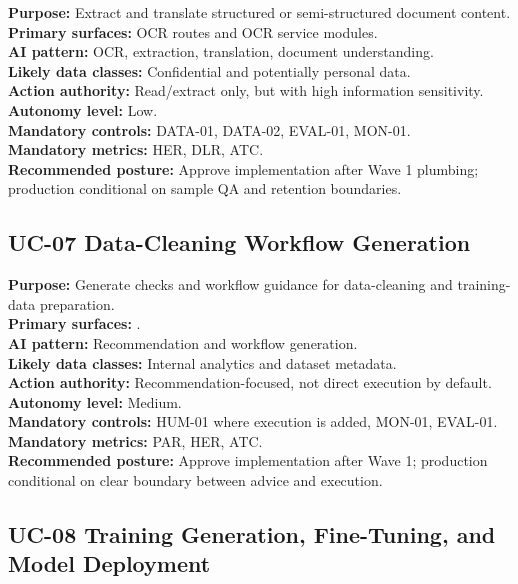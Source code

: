 \documentclass[11pt,a4paper]{article}
\begin{document}
\textbf{Purpose:} Extract and translate structured or semi-structured document content.\\
\textbf{Primary surfaces:} OCR routes and OCR service modules.\\
\textbf{AI pattern:} OCR, extraction, translation, document understanding.\\
\textbf{Likely data classes:} Confidential and potentially personal data.\\
\textbf{Action authority:} Read/extract only, but with high information sensitivity.\\
\textbf{Autonomy level:} Low.\\
\textbf{Mandatory controls:} DATA-01, DATA-02, EVAL-01, MON-01.\\
\textbf{Mandatory metrics:} HER, DLR, ATC.\\
\textbf{Recommended posture:} Approve implementation after Wave 1 plumbing; production conditional on sample QA and retention boundaries.

\subsection{UC-07 Data-Cleaning Workflow Generation}

\textbf{Purpose:} Generate checks and workflow guidance for data-cleaning and training-data preparation.\\
\textbf{Primary surfaces:} .\\
\textbf{AI pattern:} Recommendation and workflow generation.\\
\textbf{Likely data classes:} Internal analytics and dataset metadata.\\
\textbf{Action authority:} Recommendation-focused, not direct execution by default.\\
\textbf{Autonomy level:} Medium.\\
\textbf{Mandatory controls:} HUM-01 where execution is added, MON-01, EVAL-01.\\
\textbf{Mandatory metrics:} PAR, HER, ATC.\\
\textbf{Recommended posture:} Approve implementation after Wave 1; production conditional on clear boundary between advice and execution.

\subsection{UC-08 Training Generation, Fine-Tuning, and Model Deployment}
\end{document}
